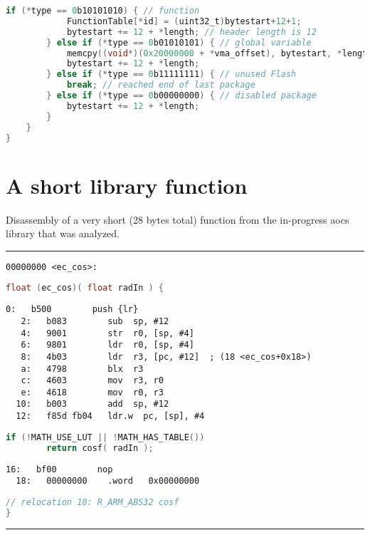 \begin{appendices}
\begin{lstlisting}[language=C]
		if (*type == 0b10101010) { // function
			FunctionTable[*id] = (uint32_t)bytestart+12+1;
			bytestart += 12 + *length; // header length is 12
		} else if (*type == 0b01010101) { // global variable
			memcpy((void*)(0x20000000 + *vma_offset), bytestart, *length);
			bytestart += 12 + *length;
		} else if (*type == 0b11111111) { // unused Flash
			break; // reached end of last package
		} else if (*type == 0b00000000) { // disabled package
			bytestart += 12 + *length;
		}
	}
}
\end{lstlisting}

\newpage
\section{A short library function}
\label{apx:cos}

Disassembly of a very short (28 bytes total) function from the in-progress \gls{aocs} library that was analyzed.

\rule{\textwidth}{0.4pt}
\begin{lstlisting}[style=asm,frame=none]
00000000 <ec_cos>:
\end{lstlisting}
\begin{lstlisting}[language=C,frame=none]
float (ec_cos)( float radIn ) {
\end{lstlisting}
\begin{lstlisting}[style=asm,frame=none]
   0:	b500      	push {lr}
   2:	b083      	sub  sp, #12
   4:	9001      	str  r0, [sp, #4]
   6:	9801      	ldr  r0, [sp, #4]
   8:	4b03      	ldr  r3, [pc, #12]	; (18 <ec_cos+0x18>)
   a:	4798      	blx  r3
   c:	4603      	mov  r3, r0
   e:	4618      	mov  r0, r3
  10:	b003      	add  sp, #12
  12:	f85d fb04 	ldr.w  pc, [sp], #4
\end{lstlisting}
\begin{lstlisting}[language=C,frame=none]
	if (!MATH_USE_LUT || !MATH_HAS_TABLE())
		return cosf( radIn );
\end{lstlisting}
\begin{lstlisting}[style=asm,frame=none]
  16:	bf00      	nop
  18:	00000000 	.word	0x00000000
\end{lstlisting}
\begin{lstlisting}[language=C,frame=none]
  // relocation 18: R_ARM_ABS32	cosf
}
\end{lstlisting}
\rule{\textwidth}{0.4pt}


\newpage
\newcommand\EngLicence{{%
\selectlanguage{english}
\section{Licence}

}}
\end{appendices}
